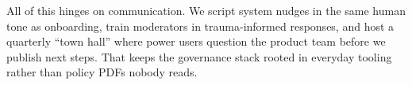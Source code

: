 All of this hinges on communication. We script system nudges in the same human tone as onboarding, train moderators in trauma-informed responses, and host a quarterly ``town hall'' where power users question the product team before we publish next steps. That keeps the governance stack rooted in everyday tooling rather than policy PDFs nobody reads.
